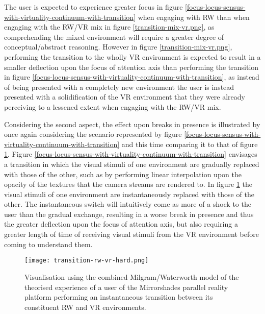The user is expected to experience greater focus in figure \ref{focus-locus-sensus-with-virtuality-continuum-with-transition} when engaging with RW than when engaging with the RW/VR mix in figure \ref{transition-mix-vr.png}, as comprehending the mixed environment will require a greater degree of conceptual/abstract reasoning. However in figure \ref{transition-mix-vr.png}, performing the transition to the wholly VR environment is expected to result in a smaller deflection upon the focus of attention axis than performing the transition in figure \ref{focus-locus-sensus-with-virtuality-continuum-with-transition}, as instead of being presented with a completely new environment the user is instead presented with a solidification of the VR environment that they were already perceiving to a lessened extent when engaging with the RW/VR mix.

Considering the second aspect, the effect upon breaks in presence is illustrated by once again considering the scenario represented by figure \ref{focus-locus-sensus-with-virtuality-continuum-with-transition} and this time comparing it to that of figure \ref{transition-rw-vr-hard.png}. Figure \ref{focus-locus-sensus-with-virtuality-continuum-with-transition} envisages a transition in which the visual stimuli of one environment are gradually replaced with those of the other, such as by performing linear interpolation upon the opacity of the textures that the camera streams are rendered to. In figure \ref{transition-rw-vr-hard.png} the visual stimuli of one environment are instantaneously replaced with those of the other. The instantaneous switch will intuitively come as more of a shock to the user than the gradual exchange, resulting in a worse break in presence and thus the greater deflection upon the focus of attention axis, but also requiring a greater length of time of receiving visual stimuli from the VR environment before coming to understand them.

\begin{figure}[h]
	\begin{center}
		\texttt{[image: transition-rw-vr-hard.png]}
		\caption{Visualisation using the combined Milgram/Waterworth model of the theorised experience of a user of the Mirrorshades parallel reality platform performing an instantaneous transition between its constituent RW and VR environments.}
		\label{transition-rw-vr-hard.png}
	\end{center}
\end{figure}

